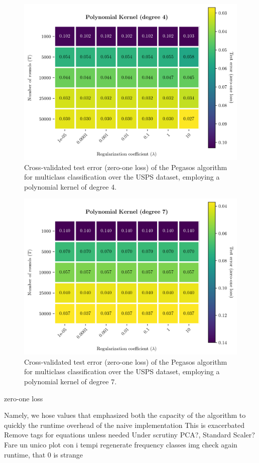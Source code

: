 \documentclass[runningheads]{llncs}
\begin{document}
\begin{figure}
  \center
  \includegraphics[width=0.8\linewidth]{../img/poly_4_error.png}
  \caption{Cross-validated test error (zero-one loss) of the Pegasos algorithm for multiclass classification over the USPS dataset, employing a polynomial kernel of degree 4.} 
  \label{fig:experiments:polynomial_4}
\end{figure}

\begin{figure}
  \center
  \includegraphics[width=0.8\linewidth]{../img/poly_7_error.png}
  \caption{Cross-validated test error (zero-one loss) of the Pegasos algorithm for multiclass classification over the USPS dataset, employing a polynomial kernel of degree 7.} 
  \label{fig:experiments:polynomial_7}
\end{figure}

zero-one loss

Namely, we
hose values that emphasized both the capacity of the algorithm to quickly 
the runtime overhead of the naive implementation 
This is exacerbated
Remove tags for equations unless needed
Under scrutiny
PCA?, Standard Scaler?
Fare un unico plot con i tempi
regenerate frequency classes img
check again runtime, that 0 is strange
\end{document}
